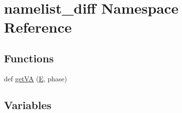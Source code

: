 \hypertarget{namespacenamelist__diff}{}\section{namelist\+\_\+diff Namespace Reference}
\label{namespacenamelist__diff}
\subsection*{Functions}
\begin{DoxyCompactItemize}
\item 
def \hyperlink{namespacenamelist__diff_a90f749c2a870b0456ecb656a84b35152}{get\+VA} (\hyperlink{namespacenamelist__diff_ae68d844b18a3d2bd16481352a89c7477}{E}, phase)
\end{DoxyCompactItemize}
\subsection*{Variables}
